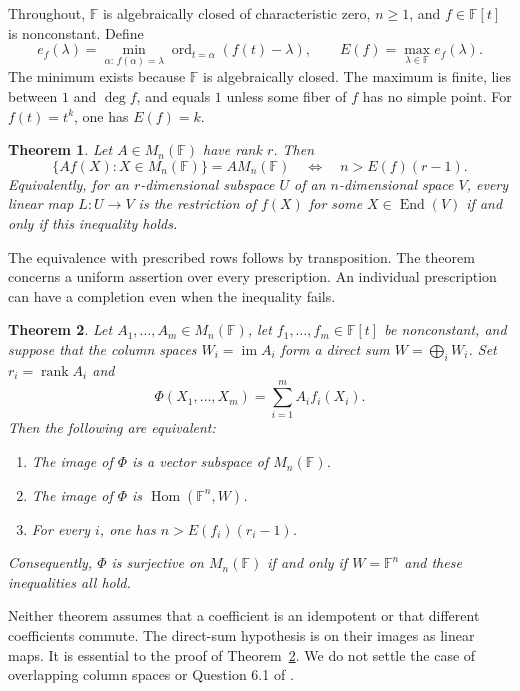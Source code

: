 \documentclass[11pt]{article}
\newtheorem{theorem}{Theorem}[section]
\theoremstyle{remark}\newtheorem{remark}[theorem]{Remark}
\newcommand{\F}{\mathbb F}
\newcommand{\im}{\operatorname{im}}
\newcommand{\rk}{\operatorname{rank}}
\newcommand{\End}{\operatorname{End}}
\newcommand{\Hom}{\operatorname{Hom}}
\begin{document}
Throughout, $\F$ is algebraically closed of characteristic zero, $n\ge1$, and $f\in\F[t]$ is nonconstant. Define
\begin{equation}\label{eq:ef}
 e_f(\lambda)=\min_{\alpha:\,f(\alpha)=\lambda}
       \operatorname{ord}_{t=\alpha}(f(t)-\lambda),
 \qquad E(f)=\max_{\lambda\in\F} e_f(\lambda).
\end{equation}
The minimum exists because $\F$ is algebraically closed. The maximum is finite, lies between $1$ and $\deg f$, and equals $1$ unless some fiber of $f$ has no simple point. For $f(t)=t^k$, one has $E(f)=k$.

\begin{theorem}\label{thm:main}
Let $A\in M_n(\F)$ have rank $r$. Then
\begin{equation}\label{eq:main}
 \{Af(X):X\in M_n(\F)\}=AM_n(\F)
 \quad\Longleftrightarrow\quad n>E(f)(r-1).
\end{equation}
Equivalently, for an $r$-dimensional subspace $U$ of an $n$-dimensional space $V$, every linear map $L:U\to V$ is the restriction of $f(X)$ for some $X\in\End(V)$ if and only if this inequality holds.
\end{theorem}

The equivalence with prescribed rows follows by transposition. The theorem concerns a uniform assertion over every prescription. An individual prescription can have a completion even when the inequality fails.

\begin{theorem}\label{thm:sum}
Let $A_1,\ldots,A_m\in M_n(\F)$, let $f_1,\ldots,f_m\in\F[t]$ be nonconstant, and suppose that the column spaces $W_i=\im A_i$ form a direct sum $W=\bigoplus_i W_i$. Set $r_i=\rk A_i$ and
\[
 \Phi(X_1,\ldots,X_m)=\sum_{i=1}^m A_i f_i(X_i).
\]
Then the following are equivalent:
\begin{enumerate}
\item The image of $\Phi$ is a vector subspace of $M_n(\F)$.
\item The image of $\Phi$ is $\Hom(\F^n,W)$.
\item For every $i$, one has $n>E(f_i)(r_i-1)$.
\end{enumerate}
Consequently, $\Phi$ is surjective on $M_n(\F)$ if and only if $W=\F^n$ and these inequalities all hold.
\end{theorem}

Neither theorem assumes that a coefficient is an idempotent or that different coefficients commute. The direct-sum hypothesis is on their images as linear maps. It is essential to the proof of Theorem~\ref{thm:sum}. We do not settle the case of overlapping column spaces or Question 6.1 of \cite{SS}.
\end{document}
